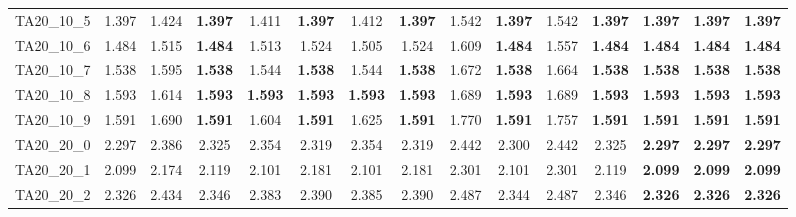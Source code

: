 \begin{tabular}{cc||ccccccccccccc}
TA20\_10\_5        & 1.397            & 1.424            & {\bf 1.397}      & 1.411            & {\bf 1.397}      & 1.412            & {\bf 1.397}      & 1.542            & {\bf 1.397}      & 1.542            & {\bf 1.397}      & {\bf 1.397}      & {\bf 1.397}      & {\bf 1.397}     \\ 
TA20\_10\_6        & 1.484            & 1.515            & {\bf 1.484}      & 1.513            & 1.524            & 1.505            & 1.524            & 1.609            & {\bf 1.484}      & 1.557            & {\bf 1.484}      & {\bf 1.484}      & {\bf 1.484}      & {\bf 1.484}     \\ 
TA20\_10\_7        & 1.538            & 1.595            & {\bf 1.538}      & 1.544            & {\bf 1.538}      & 1.544            & {\bf 1.538}      & 1.672            & {\bf 1.538}      & 1.664            & {\bf 1.538}      & {\bf 1.538}      & {\bf 1.538}      & {\bf 1.538}     \\ 
TA20\_10\_8        & 1.593            & 1.614            & {\bf 1.593}      & {\bf 1.593}      & {\bf 1.593}      & {\bf 1.593}      & {\bf 1.593}      & 1.689            & {\bf 1.593}      & 1.689            & {\bf 1.593}      & {\bf 1.593}      & {\bf 1.593}      & {\bf 1.593}     \\ 
TA20\_10\_9        & 1.591            & 1.690            & {\bf 1.591}      & 1.604            & {\bf 1.591}      & 1.625            & {\bf 1.591}      & 1.770            & {\bf 1.591}      & 1.757            & {\bf 1.591}      & {\bf 1.591}      & {\bf 1.591}      & {\bf 1.591}     \\ 
TA20\_20\_0        & 2.297            & 2.386            & 2.325            & 2.354            & 2.319            & 2.354            & 2.319            & 2.442            & 2.300            & 2.442            & 2.325            & {\bf 2.297}      & {\bf 2.297}      & {\bf 2.297}     \\ 
TA20\_20\_1        & 2.099            & 2.174            & 2.119            & 2.101            & 2.181            & 2.101            & 2.181            & 2.301            & 2.101            & 2.301            & 2.119            & {\bf 2.099}      & {\bf 2.099}      & {\bf 2.099}     \\ 
TA20\_20\_2        & 2.326            & 2.434            & 2.346            & 2.383            & 2.390            & 2.385            & 2.390            & 2.487            & 2.344            & 2.487            & 2.346            & {\bf 2.326}      & {\bf 2.326}      & {\bf 2.326}     \\ 

\end{tabular}
